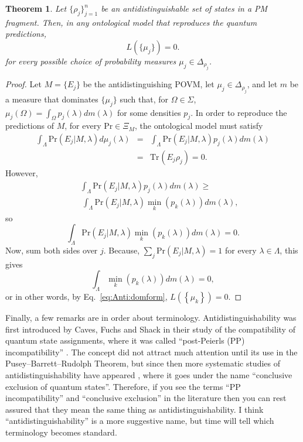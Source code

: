 \documentclass[DIV=calc,fontsize=12pt]{scrartcl} %
\theoremstyle{definition}
\theoremstyle{plain}
\newtheorem{theorem}[definition]{Theorem}
\newcommand{\Tr}[2][]{\ensuremath{\text{Tr}_{#1} \left ( #2 \right )}}
\begin{document}
\begin{theorem}
\label{thm:Anti:antiover}
Let $\{\rho_j\}_{j=1}^n$ be an antidistinguishable set of states in
a PM fragment.  Then, in any ontological model that reproduces the
quantum predictions,
\begin{equation}
L(\{\mu_j\}) = 0.
\end{equation}
for every possible choice of probability measures $\mu_j \in
\Delta_{\rho_j}$.
\end{theorem}
\begin{proof}
Let $M = \{E_j\}$ be the antidistinguishing POVM, let $\mu_j \in
\Delta_{\rho_j}$, and let $m$ be a measure that dominates
$\{\mu_j\}$ such that, for $\Omega \in \Sigma$, $\mu_j(\Omega) =
\int_{\Omega} p_j(\lambda) dm(\lambda)$ for some densities $p_j$.
In order to reproduce the predictions of $M$, for every $\text{Pr}
\in \Xi_M$, the ontological model must satisfy
\begin{eqnarray}
\int_{\Lambda} \text{Pr}(E_j|M,\lambda) d \mu_j(\lambda) & = &
\int_{\Lambda} \text{Pr}(E_j|M,\lambda) p_j(\lambda) dm(\lambda)\nonumber\\
& = & \Tr{E_j \rho_j} = 0.
\end{eqnarray}
However,
\begin{eqnarray}
&&\int_{\Lambda} \text{Pr}(E_j|M,\lambda) p_j(\lambda) dm(\lambda) \geq\nonumber\\
&&~\int_{\Lambda} \text{Pr}(E_j|M,\lambda) \min_k \left (p_k(\lambda)
\right ) dm(\lambda),
\end{eqnarray}
so
\begin{equation}
\int_{\Lambda} \text{Pr}(E_j|M,\lambda) \min_k \left (p_k(\lambda)
\right ) dm(\lambda) = 0.
\end{equation}
Now, sum both sides over $j$.  Because, $\sum_j
\text{Pr}(E_j|M,\lambda) = 1$ for every $\lambda \in \Lambda$, this
gives
\begin{equation}
\int_{\Lambda} \min_k \left ( p_k(\lambda) \right ) dm(\lambda) =
0,
\end{equation}
or in other words, by Eq.~\eqref{eq:Anti:domform}, $L \left ( \left
\{ \mu_k \right \} \right ) = 0$.
\end{proof}

Finally, a few remarks are in order about terminology.
Antidistinguishability was first introduced by Caves, Fuchs and Shack
in their study of the compatibility of quantum state assignments,
where it was called ``post-Peierls (PP) incompatibility''
\cite{Caves2002}.  The concept did not attract much attention until
its use in the Pusey--Barrett--Rudolph Theorem, but since then more systematic studies of
antidistinguishability have appeared \cite{Bandyopadhyay2013,
Perry2014}, where it goes under the name ``conclusive exclusion of
quantum states''.  Therefore, if you see the terms ``PP
incompatibility'' and ``conclusive exclusion'' in the literature then
you can rest assured that they mean the same thing as
antidistinguishability.  I think ``antidistinguishability'' is a more
suggestive name, but time will tell which terminology becomes
standard.
\end{document}
